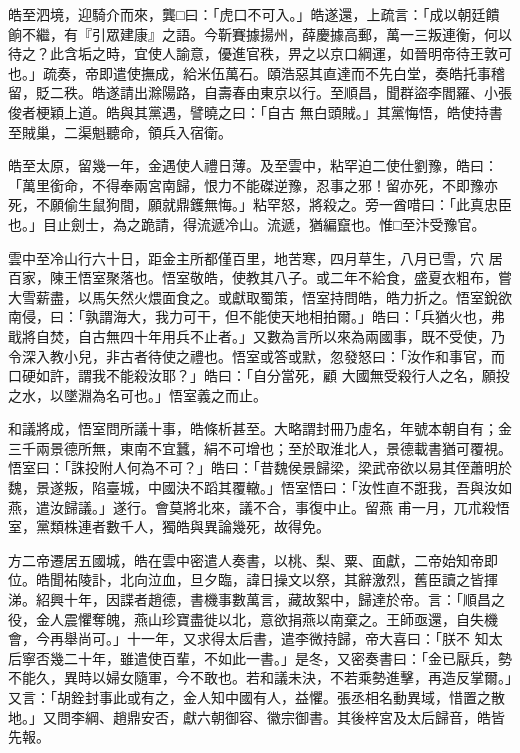 \begin{pinyinscope}
 皓至泗境，迎騎介而來，龔□曰：「虎口不可入。」皓遂還，上疏言：「成以朝廷饋餉不繼，有『引眾建康』之語。今靳賽據揚州，薛慶據高郵，萬一三叛連衡，何以待之？此含垢之時，宜使人諭意，優進官秩，畀之以京口綱運，如晉明帝待王敦可也。」疏奏，帝即遣使撫成，給米伍萬石。頤浩惡其直達而不先白堂，奏皓托事稽留，貶二秩。皓遂請出滁陽路，自壽春由東京以行。至順昌，聞群盜李閻羅、小張俊者梗穎上道。皓與其黨遇，譬曉之曰：「自古
 無白頭賊。」其黨悔悟，皓使持書至賊巢，二渠魁聽命，領兵入宿衛。



 皓至太原，留幾一年，金遇使人禮日薄。及至雲中，粘罕迫二使仕劉豫，皓曰：「萬里銜命，不得奉兩宮南歸，恨力不能磔逆豫，忍事之邪！留亦死，不即豫亦死，不願偷生鼠狗間，願就鼎鑊無悔。」粘罕怒，將殺之。旁一酋唶曰：「此真忠臣也。」目止劍士，為之跪請，得流遞冷山。流遞，猶編竄也。惟□至汴受豫官。



 雲中至冷山行六十日，距金主所都僅百里，地苦寒，四月草生，八月已雪，穴
 居百家，陳王悟室聚落也。悟室敬皓，使教其八子。或二年不給食，盛夏衣粗布，嘗大雪薪盡，以馬矢然火煨面食之。或獻取蜀策，悟室持問皓，皓力折之。悟室銳欲南侵，曰：「孰謂海大，我力可干，但不能使天地相拍爾。」皓曰：「兵猶火也，弗戢將自焚，自古無四十年用兵不止者。」又數為言所以來為兩國事，既不受使，乃令深入教小兒，非古者待使之禮也。悟室或答或默，忽發怒曰：「汝作和事官，而口硬如許，謂我不能殺汝耶？」皓曰：「自分當死，顧
 大國無受殺行人之名，願投之水，以墜淵為名可也。」悟室義之而止。



 和議將成，悟室問所議十事，皓條析甚至。大略謂封冊乃虛名，年號本朝自有；金三千兩景德所無，東南不宜蠶，絹不可增也；至於取淮北人，景德載書猶可覆視。悟室曰：「誅投附人何為不可？」皓曰：「昔魏侯景歸梁，梁武帝欲以易其侄蕭明於魏，景遂叛，陷臺城，中國決不蹈其覆轍。」悟室悟曰：「汝性直不誑我，吾與汝如燕，遣汝歸議。」遂行。會莫將北來，議不合，事復中止。留燕
 甫一月，兀朮殺悟室，黨類株連者數千人，獨皓與異論幾死，故得免。



 方二帝遷居五國城，皓在雲中密遣人奏書，以桃、梨、粟、面獻，二帝始知帝即位。皓聞祐陵訃，北向泣血，旦夕臨，諱日操文以祭，其辭激烈，舊臣讀之皆揮涕。紹興十年，因諜者趙德，書機事數萬言，藏故絮中，歸達於帝。言：「順昌之役，金人震懼奪魄，燕山珍寶盡徙以北，意欲捐燕以南棄之。王師亟還，自失機會，今再舉尚可。」十一年，又求得太后書，遣李微持歸，帝大喜曰：「朕不
 知太后寧否幾二十年，雖遣使百輩，不如此一書。」是冬，又密奏書曰：「金已厭兵，勢不能久，異時以婦女隨軍，今不敢也。若和議未決，不若乘勢進擊，再造反掌爾。」又言：「胡銓封事此或有之，金人知中國有人，益懼。張丞相名動異域，惜置之散地。」又問李綱、趙鼎安否，獻六朝御容、徽宗御書。其後梓宮及太后歸音，皓皆先報。




\end{pinyinscope}
